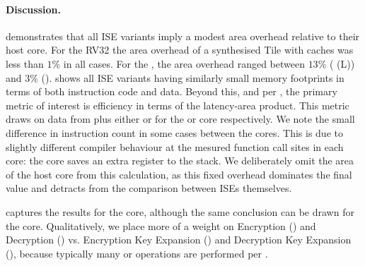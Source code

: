 \paragraph{Discussion.}
\label{sec:ise:eval:discuss}

demonstrates that all ISE variants
imply a modest area overhead relative to their host core.
For the RV32  the area overhead of a synthesised  Tile with
caches was less than $1\%$ in all cases.
For the , the area overhead ranged between
$13\%$ ( (L))
and
$3\%$ ().
shows all ISE variants
having similarly small memory footprints in terms of both instruction code and
data.
Beyond this, and per 
,
the primary metric of interest is efficiency in terms of
the latency-area product.
This metric draws on data from
plus either
or
for the  or  core respectively.
We note the small difference in instruction count in some cases between the
cores.
This is due to slightly different compiler behaviour at the mesured
function call sites in each core: the  core saves an extra
register to the stack.
We deliberately omit the area of the host core from this calculation, as this
fixed overhead dominates the final value and detracts from the comparison
between ISEs themselves.

captures the results for the  core, although the same conclusion can 
be drawn for the  core.  Qualitatively, we place more of a weight on 
Encryption ()
and 
Decryption ()
vs.
Encryption Key Expansion ()
and 
Decryption Key Expansion (),
because
typically many  or  operations are performed per
.

